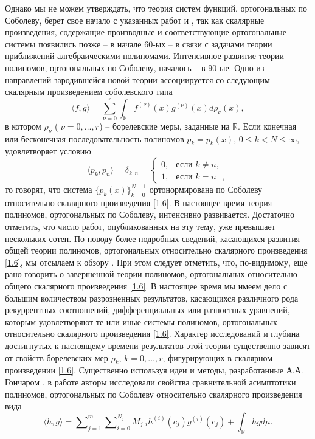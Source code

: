 Однако мы не можем утверждать, что теория систем функций, ортогональных по Соболеву, берет свое начало с указанных работ \cite{Faber} и \cite{Shauder}, так как скалярные произведения, содержащие производные и соответствующие ортогональные системы появились   \cite{Althammer} позже -- в начале 60-ых -- в связи с задачами теории приближений алгебраическими полиномами. Интенсивное развитие теории полиномов, ортогональных по Соболеву, началось   \cite{IserKoch} -- \cite{KwonLittl2} в  90-ые. Одно из направлений зародившейся новой теории ассоциируется со следующим скалярным произведением соболевского типа
\begin{equation}\label{1.6}
\langle f,g\rangle=\sum_{\nu=0}^r\int_{\mathbb{R}}f^{(\nu)}(x)g^{(\nu)}(x)d\rho_\nu(x),
\end{equation}
в котором $\rho_\nu$ ( $\nu=0,\ldots,r$) --  борелевские меры, заданные на $\mathbb{R}$. Если конечная или бесконечная  последовательность полиномов $p_k=p_k(x)$, $0\le k< N\le\infty$, удовлетворяет условию
\begin{equation}\label{1.7}
\langle p_k,p_n\rangle=\delta_{k,n}=\begin{cases}0,&\text{если $k\ne n$, }\\1,&\text{если $k= n$ }, \end{cases}
\end{equation}
то говорят, что система  $\{p_k(x)\}_{k=0}^{N-1}$ ортонормирована по Соболеву относительно скалярного произведения \eqref{1.6}. В настоящее время теория полиномов, ортогональных по Соболеву, интенсивно развивается. Достаточно отметить, что число работ, опубликованных  на эту тему, уже превышает нескольких сотен. По поводу более подробных сведений, касающихся развития общей теории полиномов, ортогональных относительно скалярного произведения \eqref{1.6}, мы отсылаем к обзору \cite{MarcelXu}. При этом следует отметить, что, по-видимому, еще рано говорить о завершенной теории полиномов, ортогональных относительно общего скалярного произведения \eqref{1.6}. В настоящее время мы имеем дело с большим количеством разрозненных результатов, касающихся различного рода рекуррентных соотношений, дифференциальных или разностных уравнений, которым удовлетворяют те или иные системы полиномов, ортогональных относительно скалярного произведения \eqref{1.6}. Характер исследований и глубина достигнутых к настоящему времени результатов этой теории существенно зависят от свойств борелевских мер $\rho_k$, $k=0,\ldots,r$, фигурирующих в скалярном произведении \eqref{1.6}. Существенно используя идеи и методы, разработанные А.А. Гончаром \cite{Gonchar1975}, в работе \cite{Lopez1995} авторы исследовали свойства сравнительной асимптотики полиномов, ортогональных по Соболеву относительно скалярного произведения вида
$$
\langle h,g\rangle=\sum\nolimits_{j=1}^m\sum\nolimits_{i=0}^{N_j}M_{j,i}h^{(i)}(c_j)g^{(i)}(c_j)+\int_{\mathbb{R}}hgd\mu.
$$

